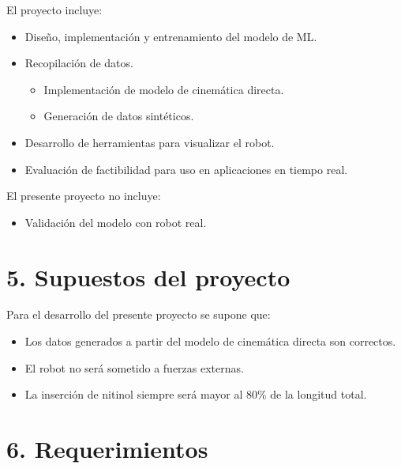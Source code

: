 \documentclass[
11pt, %
]{charter}
\begin{document}
El proyecto incluye:
\begin{itemize}
	\item Diseño, implementación y entrenamiento del modelo de ML.
	\item Recopilación de datos.
		\begin{itemize}
		\item Implementación de modelo de cinemática directa.
		\item Generación de datos sintéticos.
		\end{itemize}
	\item Desarrollo de herramientas para visualizar el robot.
	\item Evaluación de factibilidad para uso en aplicaciones en tiempo real.
	
\end{itemize}

El presente proyecto no incluye:
\begin{itemize}
	\item Validación del modelo con robot real.
	
\end{itemize}


\section{5. Supuestos del proyecto}
\label{sec:supuestos}

Para el desarrollo del presente proyecto se supone que:

\begin{itemize}
	\item Los datos generados a partir del modelo de cinemática directa son correctos.
	\item El robot no será sometido a fuerzas externas.
	\item La inserción de nitinol siempre será mayor al 80\% de la longitud total.
\end{itemize}

\section{6. Requerimientos}
\label{sec:requerimientos}
\end{document}

